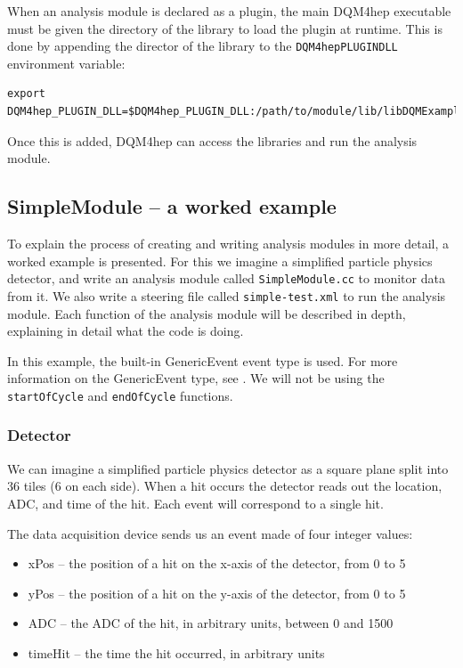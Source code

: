 When an analysis module is declared as a plugin, the main \acrshort{DQM4hep} executable must be given the directory of the library to load the plugin at runtime. This is done by appending the director of the library to the \texttt{DQM4hep\textunderscore PLUGIN\textunderscore DLL} environment variable:

\begin{lstlisting}
export DQM4hep_PLUGIN_DLL=$DQM4hep_PLUGIN_DLL:/path/to/module/lib/libDQMExample.so
\end{lstlisting}

Once this is added, \acrshort{DQM4hep} can access the libraries and run the analysis module.

\subsection{SimpleModule – a worked example} 
To explain the process of creating and writing analysis modules in more detail, a worked example is presented. For this we imagine a simplified particle physics detector, and write an analysis module called \texttt{SimpleModule.cc} to monitor data from it. We also write a steering file called \texttt{simple-test.xml} to run the analysis module. Each function of the analysis module will be described in depth, explaining in detail what the code is doing. 

In this example, the built-in GenericEvent event type is used. For more information on the GenericEvent type, see \cite{dqm4hep-user-manual-genericevent}. We will not be using the \texttt{startOfCycle} and \texttt{endOfCycle} functions.


\subsubsection{Detector}
We can imagine a simplified particle physics detector as a square plane split into 36 tiles (6 on each side). When a hit occurs the detector reads out the location, \acrshort{ADC}, and time of the hit. Each event will correspond to a single hit.

The data acquisition device sends us an event made of four integer values:

\begin{itemize}
	\item xPos -- the position of a hit on the x-axis of the detector, from 0 to 5
	\item yPos -- the position of a hit on the y-axis of the detector, from 0 to 5
	\item ADC -- the \acrshort{ADC} of the hit, in arbitrary units, between 0 and 1500
	\item timeHit -- the time the hit occurred, in arbitrary units
\end{itemize}

